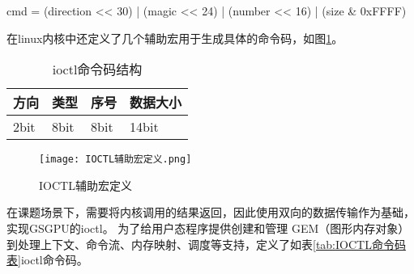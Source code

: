 cmd = (direction << 30) | (magic << 24) | (number << 16) | (size \& 0xFFFF)

在linux内核中还定义了几个辅助宏用于生成具体的命令码，如图\ref{fig:IOCTL辅助宏定义}。

\begin{table}[h]
  \centering
  \caption{ioctl命令码结构}
  \label{tab:ioctl命令码结构}
  \begin{tabular}{llll}
    \toprule
    方向  & 类型 & 序号 & 数据大小 \\
    \midrule
    2bit & 8bit & 8bit & 14bit \\
    \bottomrule
  \end{tabular}
  \note{}
\end{table}

\begin{figure}[h]
  \centering
  \texttt{[image: IOCTL辅助宏定义.png]}
  \caption{IOCTL辅助宏定义}
  \label{fig:IOCTL辅助宏定义}
\end{figure}

在课题场景下，需要将内核调用的结果返回，因此使用双向的数据传输作为基础，实现GSGPU的ioctl。
为了给用户态程序提供创建和管理 GEM（图形内存对象）到处理上下文、命令流、内存映射、调度等支持，定义了如表\ref{tab:IOCTL命令码表}ioctl命令码。

